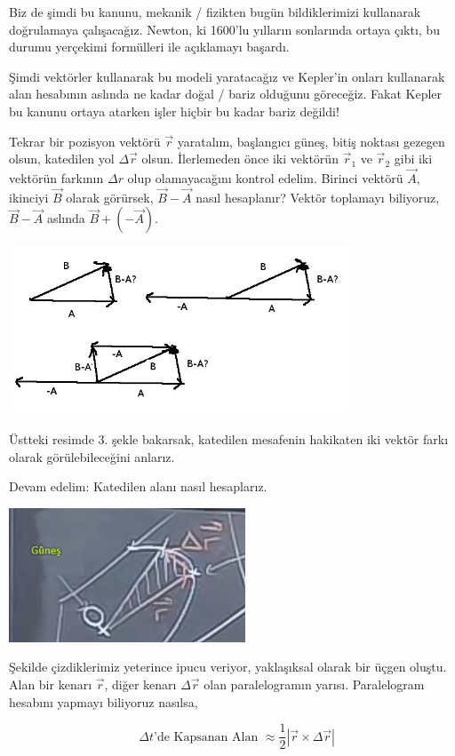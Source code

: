 \documentclass[12pt,fleqn]{article}\usepackage{../../common}
\begin{document}
Biz de şimdi bu kanunu, mekanik / fizikten bugün bildiklerimizi kullanarak
doğrulamaya çalışacağız. Newton, ki 1600'lu yılların sonlarında ortaya
çıktı, bu durumu yerçekimi formülleri ile açıklamayı başardı. 

Şimdi vektörler kullanarak bu modeli yaratacağız ve Kepler'in onları
kullanarak alan hesabının aslında ne kadar doğal / bariz olduğunu
göreceğiz. Fakat Kepler bu kanunu ortaya atarken işler hiçbir bu kadar
bariz değildi!

Tekrar bir pozisyon vektörü $\vec{r}$ yaratalım, başlangıcı güneş, bitiş noktası
gezegen olsun, katedilen yol $\Delta \vec{r}$ olsun. İlerlemeden önce iki
vektörün $\vec{r}_1$ ve $\vec{r}_2$ gibi iki vektörün farkının $\Delta r$ olup
olamayacağını kontrol edelim. Birinci vektörü $\vec{A}$, ikinciyi $\vec{B}$
olarak görürsek, $\vec{B} - \vec{A}$ nasıl hesaplanır?  Vektör toplamayı
biliyoruz, $\vec{B} - \vec{A}$ aslında $\vec{B} + (-\vec{A})$.

\includegraphics[height=5cm]{6_11.png}

Üstteki resimde 3. şekle bakarsak, katedilen mesafenin hakikaten iki vektör
farkı olarak görülebileceğini anlarız. 

Devam edelim: Katedilen alanı nasıl hesaplarız. 

\includegraphics[height=4cm]{6_7.png}

Şekilde çizdiklerimiz yeterince ipucu veriyor, yaklaşıksal olarak bir üçgen
oluştu. Alan bir kenarı $\vec{r}$, diğer kenarı $\Delta \vec{r}$ olan
paralelogramın yarısı. Paralelogram hesabını yapmayı biliyoruz nasılsa,

$$ 
\textrm{ $\Delta t$'de Kapsanan Alan } \approx
\frac{1}{2} |\vec{r} \times \Delta \vec{r}| 
$$
\end{document}
